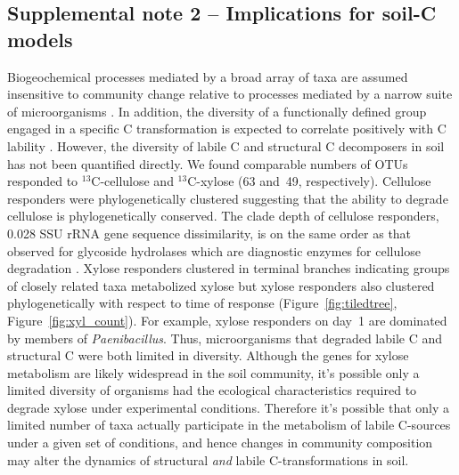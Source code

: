\documentclass{article}
\begin{document}
\subsection{Supplemental note 2 -- Implications for soil-C models}
Biogeochemical processes mediated by a broad array of taxa are assumed
insensitive to community change relative to
processes mediated by a narrow suite of microorganisms
\citep{Schimel_1995,McGuire2010}. In addition, the diversity of
a functionally defined group engaged in a specific C transformation is
expected to correlate positively with C lability \citep{McGuire2010}.
However, the diversity of labile C and structural C decomposers in soil
has not been quantified directly. We found comparable numbers of OTUs
responded to $^{13}$C-cellulose and $^{13}$C-xylose (63 and~49,
respectively). Cellulose responders were phylogenetically clustered
suggesting that the ability to degrade cellulose is phylogenetically
conserved. The clade depth of cellulose responders, 0.028 SSU rRNA gene
sequence dissimilarity, is on the same order as that observed for
glycoside hydrolases which are diagnostic enzymes for cellulose
degradation \citep{Berlemont2013}. Xylose responders clustered in terminal
branches indicating groups of closely related taxa metabolized xylose but
xylose responders also clustered phylogenetically with respect to time of
response (Figure~\ref{fig:tiledtree}, Figure~\ref{fig:xyl_count}).
For example, xylose responders on day~1 are dominated by members of
\textit{Paenibacillus}. Thus, microorganisms that degraded labile C and
structural C were both limited in diversity. Although the genes for xylose
metabolism are likely widespread in the soil community, it's possible only
a limited diversity of organisms had the ecological characteristics
required to degrade xylose under experimental conditions. Therefore it's
possible that only a limited number of taxa actually participate in the
metabolism of labile C-sources under a given set of conditions, and hence
changes in community composition may alter the dynamics of structural
\textit{and} labile C-transformations in soil.
\end{document}
